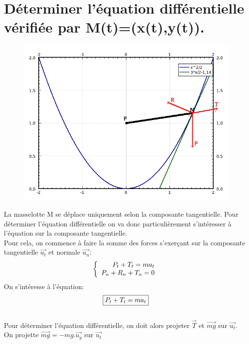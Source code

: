 \documentclass[10pt,a4paper]{article}
\begin{document}
\section{Déterminer l'équation différentielle vérifiée par M(t)=(x(t),y(t)).}
\begin{figure}[H]
	\includegraphics[scale=0.7]{GraphMath2.png}
\end{figure}
La masselotte M se déplace uniquement selon la composante tangentielle. Pour déterminer l'équation différentielle on va donc particulièrement s'intéresser à l'équation sur la composante tangentielle.\\
Pour cela, on commence à faire la somme des forces s'exerçant sur la composante tangentielle $\vec{u_t}$ et normale $\vec{u_n}$:
\[
   \left \{
   \begin{array}{r c l}
      P_t+T_t=ma_t  \\
      P_n+R_n+T_n=0 
   \end{array}
   \right .
\]
On s'intéresse à l'équation: \[\fbox{$P_t+T_t=ma_t$}\] \\ 
Pour déterminer l'équation différentielle, on doit alors projeter $\vec{T}$ et  $\vec{mg}$ sur $\vec{u_t}$. \\
On projette $\vec{mg}=-mg.\vec{u_y}$ sur $\vec{u_t}$\\
\end{document}
